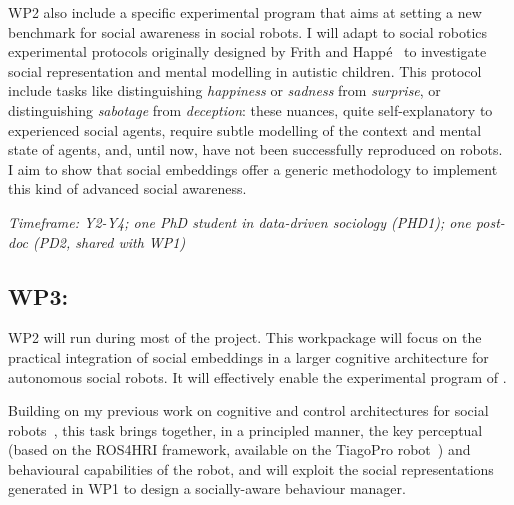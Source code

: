 WP2 also include a specific experimental program that aims at setting a new
benchmark for social awareness in social robots. I will adapt to social
robotics~\cite{lemaignan2015mutual} experimental protocols originally designed
by Frith and Happé~\cite{frith1994autism} to investigate social representation
and mental modelling in autistic children.  This protocol include tasks like
distinguishing \emph{happiness} or \emph{sadness} from \emph{surprise}, or
distinguishing \emph{sabotage} from \emph{deception}: these nuances, quite
self-explanatory to experienced social agents, require subtle modelling of the
context and mental state of agents, and, until now, have not been successfully
reproduced on robots. I aim to show that social embeddings offer a generic
methodology to implement this kind of advanced social awareness.


\vspace{1em}
\noindent\emph{Timeframe: Y2-Y4; one PhD student in data-driven sociology
    (PHD1); one post-doc (PD2, shared with WP1)}

\subsection{WP3: \textbf{\wpThree}}



%
%

WP2 will run during most of the project. This workpackage will focus on the
practical integration of social embeddings in a larger cognitive architecture
for autonomous social robots. It will effectively enable the experimental
program of \project.

Building on my previous work on cognitive and control architectures for social
robots~\cite{lemaignan2017artificial,lemaignan2015pyrobots,baxter2016cognitive,lemaignan2014challenges,lemaignan2011what},
this task brings together, in a principled manner, the key perceptual (based on
the ROS4HRI framework, available on the TiagoPro robot~\cite{ros2023ros4hri})
and behavioural capabilities of the robot, and will exploit the social
representations generated in WP1 to design a socially-aware behaviour manager.

